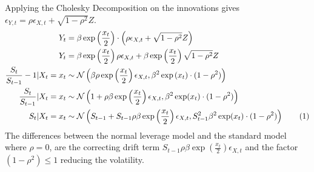 \documentclass[11pt,a4,twosided,singlespacing,titlepagenumber=on]{scrreprt}
\numberwithin{equation}{chapter} %
\theoremstyle{remark}
\newcommand\numberthis{\addtocounter{equation}{1}\tag{\theequation}}
\begin{document}
Applying the Cholesky Decomposition on the innovations gives $\epsilon_{Y,t} = \rho \epsilon_{X,t} + \sqrt{1-\rho^2} Z$.
\begin{align*}
Y_t 								&= \beta \exp \left(\frac{x_t}{2}\right) \cdot \left( \rho \epsilon_{X,t} + \sqrt{1-\rho^2} Z \right) \\
Y_t 								&= \beta \exp \left(\frac{x_t}{2}\right)  \rho \epsilon_{X,t} + \beta \exp \left(\frac{x_t}{2}\right) \sqrt{1-\rho^2} Z \\
\frac{S_t}{S_{t-1}}-1 | X_t = x_t 					&\sim \mathcal{N} \left(\beta \rho \exp \left(\frac{x_t}{2}\right) \epsilon_{X,t}, \beta^2 \exp \left(x_t\right) \cdot (1-\rho^2) \right) \\
\frac{S_t}{S_{t-1}} | X_t = x_t 	&\sim \mathcal{N}\left(1 + \rho \beta \exp \left(\frac{x_t}{2} \right) \epsilon_{X,t}, \beta^2 \exp(x_t) \cdot (1-\rho^2)\right) \\
S_t | X_t = x_t 					&\sim \mathcal{N}\left( S_{t-1} + S_{t-1} \rho \beta \exp \left(\frac{x_t}{2} \right) \epsilon_{X,t}, S_{t-1}^2 \beta^2 \exp(x_t) \cdot (1-\rho^2)\right) \numberthis
\end{align*}
The differences between the normal leverage model and the standard model where $\rho = 0$, are the correcting drift term $S_{t-1} \rho \beta \exp \left(\frac{x_t}{2} \right) \epsilon_{X,t}$ and the factor $(1-\rho^2) \leq 1$ reducing the volatility.

\end{document}
